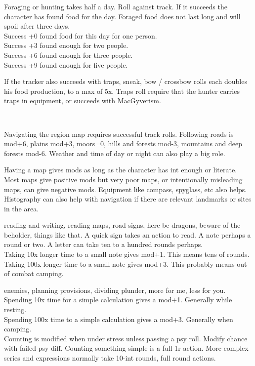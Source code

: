 Foraging or hunting takes half a day. Roll against track. If it succeeds the character has found food for the day. Foraged food does not last long and will spoil after three days. \\
Success +0 found food for this day for one person. \\
Success +3 found enough for two people. \\
Success +6 found enough for three people. \\
Success +9 found enough for five people.

If the tracker also succeeds with traps, sneak, bow / crossbow rolls each doubles his food production, to a max of 5x. Traps roll require that the hunter carries traps in equipment, or succeeds with MacGyverism.

\

Navigating the region map requires successful track rolls. Following roads is mod+6, plains mod+3, moors=0, hills and forests mod-3, mountains and deep forests mod-6. Weather and time of day or night can also play a big role.

Having a map gives mods as long as the character has int enough or literate. Most maps give positive mods but very poor maps, or intentionally misleading maps, can give negative mods. Equipment like compass, spyglass, etc also helps. Histography can also help with navigation if there are relevant landmarks or sites in the area.


 reading and writing, reading maps, road signs, here be dragons, beware of the beholder, things like that. A quick sign takes an action to read. A note perhaps a round or two. A letter can take ten to a hundred rounds perhaps. \\
Taking 10x longer time to a small note gives mod+1. This means tens of rounds. \\
Taking 100x longer time to a small note gives mod+3. This probably means out of combat camping.


 enemies, planning provisions, dividing plunder, more for me, less for you. \\
Spending 10x time for a simple calculation gives a mod+1. Generally while resting.\\
Spending 100x time to a simple calculation gives a mod+3. Generally when camping.\\

Counting is modified when under stress unless passing a psy roll. Modify chance with failed psy diff. Counting something simple is a full 1r action. More complex series and expressions normally take 10-int rounds, full round actions.

